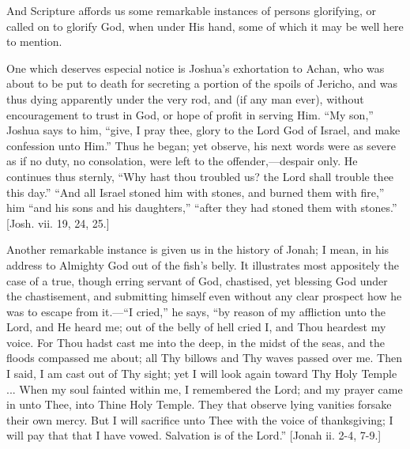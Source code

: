 And Scripture affords us some remarkable instances of persons
glorifying, or called on to glorify God, when under His hand, some of
which it may be well here to mention.

One which deserves especial notice is Joshua's exhortation to Achan,
who was about to be put to death for secreting a portion of the spoils
of Jericho, and was thus dying apparently under the very rod, and (if
any man ever), without encouragement to trust in God, or hope of profit in serving Him. ``My son,'' Joshua says to him,
``give, I pray thee, glory to the Lord God of Israel, and make
confession unto Him.'' Thus he began; yet observe, his next words
were as severe as if no duty, no consolation, were left to the
offender,—despair only. He continues thus sternly, ``Why hast
thou troubled us? the Lord shall trouble thee this day.''
``And all Israel stoned him with stones, and burned them with
fire,'' him ``and his sons and his daughters,''
``after they had stoned them with stones.'' [Josh. vii. 19,
24, 25.]

Another remarkable instance is given us in the history of Jonah; I
mean, in his address to Almighty God out of the fish's belly. It
illustrates most appositely the case of a true, though erring servant
of God, chastised, yet blessing God under the chastisement, and
submitting himself even without any clear prospect how he was to
escape from it.—``I cried,'' he says, ``by reason of my
affliction unto the Lord, and He heard me; out of the belly of hell
cried I, and Thou heardest my voice. For Thou hadst cast me into the
deep, in the midst of the seas, and the floods compassed me about; all
Thy billows and Thy waves passed over me. Then I said, I am cast out
of Thy sight; yet I will look again toward Thy Holy Temple ... When my
soul fainted within me, I remembered the Lord; and my prayer came in
unto Thee, into Thine Holy Temple. They that observe lying vanities
forsake their own mercy. But I will sacrifice unto Thee with the voice
of thanksgiving; I will pay that that I have vowed. Salvation is of
the Lord.'' [Jonah ii. 2-4, 7-9.]


